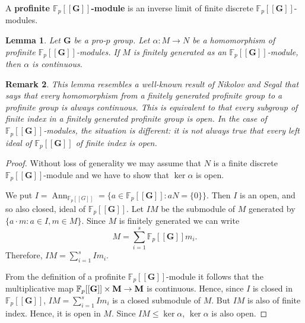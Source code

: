 \documentclass[11pt]{amsart}
\newtheorem{lem}{Lemma}[section]
\newtheorem{rem}[lem]{Remark}
\numberwithin{claimcounter}{lem}
\DeclareMathOperator{\Ann}{Ann}
\newcommand{\F}{\mathbb{F}}
\begin{document}
     A {\bf profinite $\F_p[[\mathbf G]]$-module} is an inverse limit of finite discrete $\F_p[[\mathbf G]]$-modules.
    \begin{lem}\label{continuous} 
    Let $\mathbf G$ be a  pro-$p$ group.
   Let $\alpha: M\to N$ be a homomorphism of profinite $\F_p[[\mathbf G]]$-modules. If $M$ is finitely generated as an $\F_p[[\mathbf G]]$-module, then $\alpha$ is continuous.
   \end{lem}
   \begin{rem}
   This lemma resembles  a well-known result of Nikolov and Segal \cite{NS07} that says that every  homomorphism from a finitely generated profinite group to a profinite group is always continuous. This is   equivalent to  that every subgroup of finite index in a finitely generated profinite group is open. In the case of $\F_p[[\mathbf G]]$-modules, the situation is different:  it is not always true that every left ideal of $\F_p[[\mathbf G]]$ of finite index is open.
   \end{rem}
   \begin{proof} Without loss of generality we may  assume that $N$ is a finite discrete $\F_p[[\mathbf G]]$-module and we have to show that $\ker \alpha $ is open. 
   
   We put  $I=\Ann_{\F_p[[G]]}=\{a\in \F_p[[\mathbf G]]\colon aN=\{0\}\}$. Then $I$ is an open, and so also closed,  ideal of $\F_p[[\mathbf G]]$. Let $IM$ be the submodule of $M$ generated by $\{a\cdot m\colon a\in I, m\in M\}$. Since $M$ is finitely generated we can write $$M=\sum_{i=1}^s \F_p[[\mathbf G]]m_i.$$ Therefore,  $IM=\sum_{i=1}^s Im_i$.
   
   From the definition of a profinite $\F_p[[\mathbf G]]$-module it follows that the multiplicative map $\F_p[[\bf G]]\times M\to M$ is continuous. Hence, since $I$ is closed in $\F_p[[\mathbf G]]$,
$IM=\sum_{i=1}^s Im_i$ is a closed submodule of $M$. But $IM$ is also of finite index. Hence, it  is open in $M$. Since $IM\le \ker \alpha$, $\ker \alpha$ is also open.   
   \end{proof}
    
\end{document}
